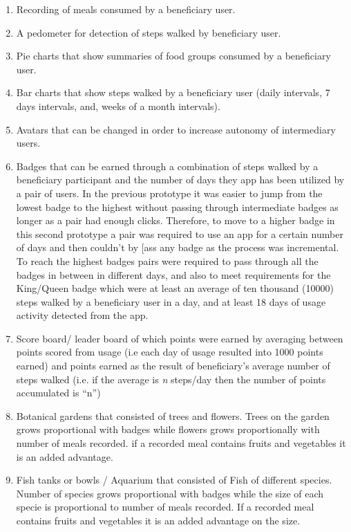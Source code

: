 \begin{enumerate}
\item{Recording of meals} consumed by a beneficiary user.
\item{A pedometer} for detection of steps walked by beneficiary user.
\item{Pie charts} that show summaries of food groups consumed by a beneficiary user.
\item{Bar charts} that show steps walked by a beneficiary user (daily intervals, 7 days intervals, and, weeks of a month intervals).
\item{Avatars} that can be changed in order to increase autonomy of intermediary users.
\item{Badges} that can be earned through a combination of steps walked by a beneficiary participant and the number of days they app has been utilized by a pair of users. In the previous prototype it was easier to jump from the lowest badge to the highest without passing through intermediate badges as longer as a pair had enough clicks. Therefore, to move to a higher badge in this second prototype a pair was required to use an app for a certain number of days and then couldn't by [ass any badge as the process was incremental. To reach the highest badges pairs were required to pass through all the badges in between in different days, and also to meet requirements for the King/Queen badge which were at least an average of ten thousand (10000) steps walked by a beneficiary user in a day, and at least 18 days of usage activity detected from the app. 
\item{Score board/ leader board} of which points were earned by averaging between points scored from usage (i.e each day of usage resulted into 1000 points earned) and points earned as the result of beneficiary's average number of steps walked (i.e. if the average is \emph{n} steps/day then the number of points accumulated is ``n'')
\item{Botanical gardens} that consisted of trees and flowers. Trees on the garden grows proportional with badges while flowers grows proportionally with number of meals recorded. if a recorded meal contains fruits and vegetables it is an added advantage.
\item{Fish tanks or bowls / Aquarium} that consisted of Fish of different species. Number of species grows proportional with badges while the size of each specie is proportional to number of meals recorded. If a recorded meal contains fruits and vegetables it is an added advantage on the size.
\end{enumerate}

